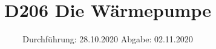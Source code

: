 

\subject{Versuch Nr.1}
\title{D206 Die Wärmepumpe}
\date{%
  Durchführung: 28.10.2020
  \hspace{3em}
  Abgabe: 02.11.2020
}



\maketitle
\thispagestyle{empty}
\tableofcontents
\newpage






\printbibliography{}


